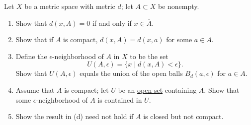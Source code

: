   \begin{exercise}[Munkres 27.2]
    Let $X$ be a metric space with metric $d$; let $A \subset X$ be nonempty.
    \begin{enumerate}
      \item[(a)] Show that $d(x, A) = 0$ if and only if $x \in \overline{A}$.
      \item[(b)] Show that if $A$ is compact, $d(x, A) = d(x, a)$ for some $a \in A$.
      \item[(c)] Define the $\epsilon$-neighborhood of $A$ in $X$ to be the set
        \begin{equation}
          U(A, \epsilon) = \{x \mid d(x, A) < \epsilon\}.
        \end{equation}
        Show that $U(A, \epsilon)$ equals the union of the open balls $B_d(a, \epsilon)$ for $a \in A$.
      \item[(d)] Assume that $A$ is compact; let $U$ be an \hyperref[def:open-set]{open set} containing $A$. Show that some $\epsilon$-neighborhood of $A$ is contained in $U$.
      \item[(e)] Show the result in (d) need not hold if $A$ is closed but not compact.
    \end{enumerate}
  \end{exercise}
